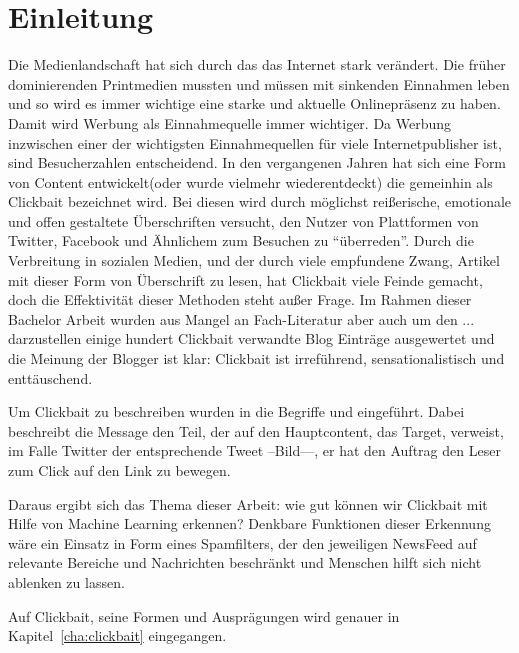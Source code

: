 \chapter{Einleitung}\label{introduction}
Die Medienlandschaft hat sich durch das das Internet stark verändert. Die früher dominierenden Printmedien mussten und müssen mit sinkenden Einnahmen leben und so wird es immer wichtige eine starke und aktuelle Onlinepräsenz zu haben. Damit wird Werbung als Einnahmequelle immer wichtiger. Da Werbung inzwischen einer der wichtigsten Einnahmequellen für viele Internetpublisher ist, sind Besucherzahlen entscheidend.
In den vergangenen Jahren hat sich eine Form von Content entwickelt(oder wurde vielmehr wiederentdeckt) die gemeinhin als Clickbait bezeichnet wird.
Bei diesen wird durch möglichst reißerische, emotionale und offen gestaltete Überschriften versucht, den Nutzer von Plattformen von Twitter, Facebook und Ähnlichem zum Besuchen zu ``überreden''.  Durch die Verbreitung in sozialen Medien, und der durch viele empfundene Zwang, Artikel mit dieser Form von Überschrift zu lesen, hat Clickbait viele Feinde gemacht, doch die Effektivität dieser Methoden steht außer Frage. Im Rahmen dieser Bachelor Arbeit wurden aus Mangel an Fach-Literatur aber auch um den ... darzustellen einige hundert Clickbait verwandte Blog Einträge ausgewertet und die Meinung der Blogger ist klar: Clickbait ist irreführend, sensationalistisch und enttäuschend. 

Um Clickbait zu beschreiben wurden in \cite{paper:clickbait-detection2} die Begriffe  und  eingeführt. Dabei beschreibt die Message den Teil, der auf den Hauptcontent, das Target, verweist, im Falle Twitter der entsprechende Tweet --Bild---, er hat den Auftrag den Leser zum Click auf den Link zu bewegen.

Daraus ergibt sich das Thema dieser Arbeit: wie gut können wir Clickbait mit Hilfe von Machine Learning erkennen? 
Denkbare Funktionen dieser Erkennung wäre ein Einsatz in Form eines Spamfilters, der den jeweiligen NewsFeed auf relevante Bereiche und Nachrichten beschränkt und Menschen hilft sich nicht ablenken zu lassen.

Auf Clickbait, seine Formen und Ausprägungen wird genauer in Kapitel~\ref{cha:clickbait} eingegangen.

